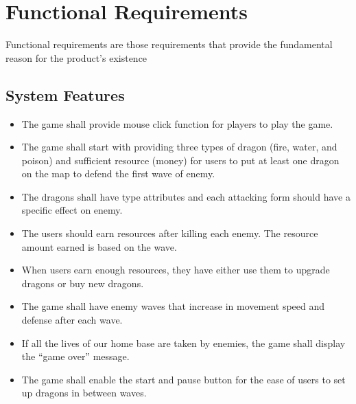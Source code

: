 \documentclass{article}
\begin{document}
\section{Functional Requirements}
Functional requirements are those requirements that provide the fundamental reason for the product's existence

\subsection{System Features}
\begin{itemize}
    \item The game shall provide mouse click function for players to play the game.
    \item The game shall start with providing three types of dragon (fire, water, and poison) and sufficient resource (money) for users to put at least one dragon on the map to defend the first wave of enemy.
    \item The dragons shall have type attributes and each attacking form should have a specific effect on enemy.
    \item The users should earn resources after killing each enemy. The resource amount earned is based on the wave.
    \item When users earn enough resources, they have either use them to upgrade dragons or buy new dragons.
    \item The game shall have enemy waves that increase in movement speed and defense after each wave.
    \item If all the lives of our home base are taken by enemies, the game shall display the “game over” message.
    \item The game shall enable the start and pause button for the ease of users to set up dragons in between waves.
\end{itemize}

\newpage
\end{document}
